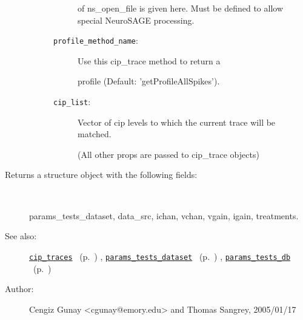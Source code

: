 \begin{description}
\begin{description}
\begin{description}
of ns\_open\_file is given here. Must be defined to allow
special NeuroSAGE processing.
\item[\texttt{profile\_method\_name}:]
 Use this cip\_trace method to return a

profile (Default: 'getProfileAllSpikes').
\item[\texttt{cip\_list}:]
 Vector of cip levels to which the current trace will be matched.

(All other props are passed to cip\_trace objects)
\end{description}%
\end{description}%
%
\item[Returns a structure object with the following fields:
]~

	params\_tests\_dataset,
	data\_src, ichan, vchan, vgain, igain, treatments.
%
%
\item[See also:]%
\hyperlink{ref_cip_traces}{\texttt{cip\_traces}}%
\ (p.~\pageref{ref_cip_traces})%
%
, \hyperlink{ref_params_tests_dataset}{\texttt{params\_tests\_dataset}}%
\ (p.~\pageref{ref_params_tests_dataset})%
%
, \hyperlink{ref_params_tests_db}{\texttt{params\_tests\_db}}%
\ (p.~\pageref{ref_params_tests_db})%
%
%
\item[Author:]%
Cengiz Gunay <cgunay@emory.edu> and Thomas Sangrey, 2005/01/17
%
\end{description}
\methodline%
